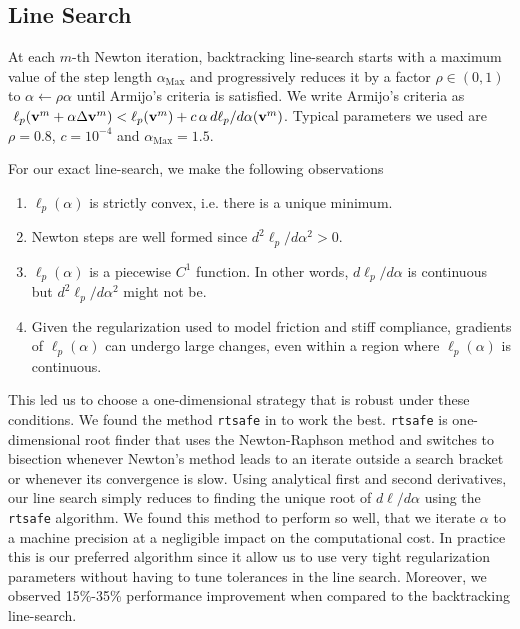 \subsection{Line Search}

At each $m\text{-th}$ Newton iteration, backtracking line-search starts with a
maximum value of the step length $\alpha_\text{Max}$ and progressively reduces
it by a factor $\rho \in (0, 1)$ to $\alpha\gets\rho\alpha$ until Armijo's
criteria \cite[\S 3.1]{bib:nocedal2006numerical} is satisfied. We write Armijo's
criteria as $~\ell_p({\mathbf{v}}^m + \alpha \Delta{\mathbf{v}}^{m}) < \ell_p({\mathbf{v}}^m) +
c\,\alpha\,d\ell_p/d\alpha({\mathbf{v}}^m)$. Typical parameters we used are
$\rho=0.8$, $c=10^{-4}$ and $\alpha_\text{Max}=1.5$.

For our exact line-search, we make the following observations
\begin{enumerate}
	\item $\ell_p(\alpha)$ is strictly convex, i.e. there is a unique minimum.
	\item Newton steps are well formed since $d^2\ell_p/d\alpha^2>0$.
	\item $\ell_p(\alpha)$ is a piecewise $C^1$ function. In other words,
	$d\ell_p/d\alpha$ is continuous but $d^2\ell_p/d\alpha^2$ might not be.	
	\item Given the regularization used to model friction and stiff compliance,
	gradients of $\ell_p(\alpha)$ can undergo large changes, even within a
	region where $\ell_p(\alpha)$ is continuous.
\end{enumerate}

This led us to choose a one-dimensional strategy that is robust under these
conditions. We found the method \verb;rtsafe; in \cite[\S
9.4]{bib:numerical_recipes} to work the best. \verb;rtsafe; is one-dimensional
root finder that uses the Newton-Raphson method and switches to bisection
whenever Newton's method leads to an iterate outside a search bracket or
whenever its convergence is slow. Using analytical first and second derivatives,
our line search simply reduces to finding the unique root of $d\ell/d\alpha$
using the \verb;rtsafe; algorithm. We found this method to perform so well, that
we iterate $\alpha$ to a machine precision at a negligible impact on the
computational cost. In practice this is our preferred algorithm since it allow
us to use very tight regularization parameters without having to tune tolerances
in the line search. Moreover, we observed 15\%-35\% performance improvement when
compared to the backtracking line-search.

